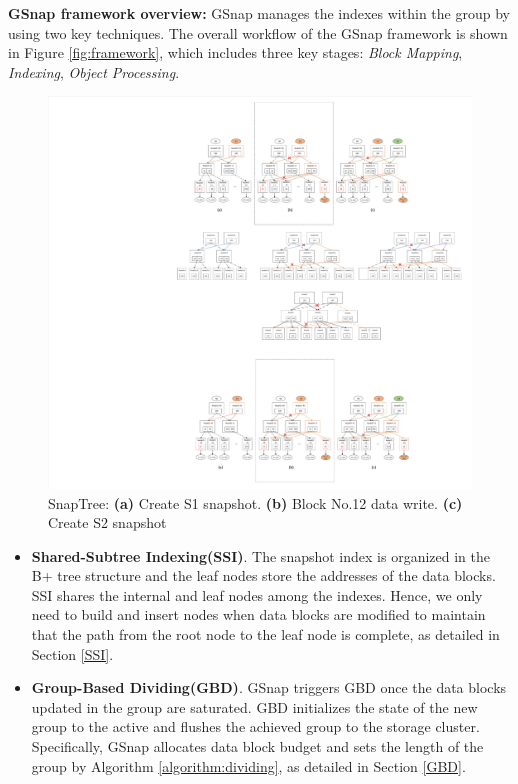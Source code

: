 \documentclass[sigconf, nonacm]{acmart}
\begin{document}
\textbf{GSnap framework overview:} GSnap manages the indexes within the group by using two key techniques. The overall workflow of the GSnap framework is shown in Figure \ref{fig:framework}, which includes three key stages: \emph{Block Mapping}, \emph{Indexing}, \emph{Object Processing}.
\begin{figure}[htp]
	\centering
	\includegraphics[width=16cm]{figures/ceph_pic/snaptree.pdf}
	\caption{SnapTree: \textbf{(a)} Create S1 snapshot. \textbf{(b)} Block No.12 data write. \textbf{(c)} Create S2 snapshot}
	\label{fig:snaptree}
\end{figure}
\begin{itemize}
	\item \textbf{Shared-Subtree Indexing(SSI)}. The snapshot index is organized in the B+ tree structure and the leaf nodes store the addresses of the data blocks. SSI shares the internal and leaf nodes among the indexes. Hence, we only need to build and insert nodes when data blocks are modified to maintain that the path from the root node to the leaf node is complete, as detailed in Section \ref{SSI}.
	\item \textbf{Group-Based Dividing(GBD)}. 
	GSnap triggers GBD once the data blocks updated in the group are saturated. GBD initializes the state of the new group to the active and flushes the achieved group to the storage cluster. Specifically, GSnap allocates data block budget and sets the length of the group by Algorithm \ref{algorithm:dividing}, as detailed in Section \ref{GBD}.
\end{itemize}
\end{document}

